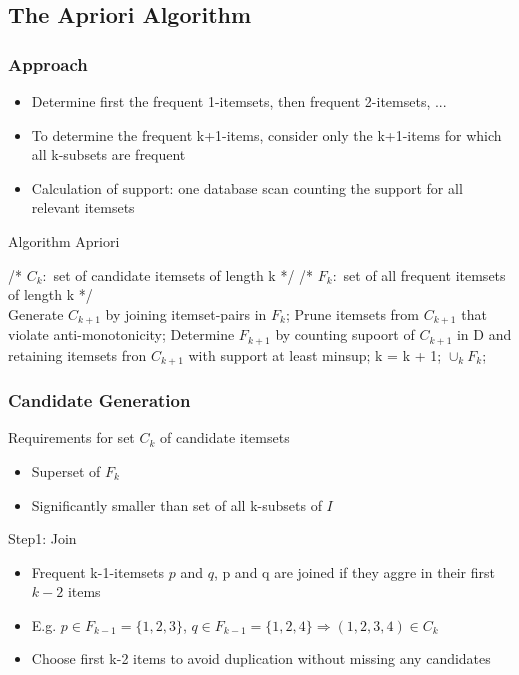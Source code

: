 \documentclass[../notes.tex]{subfiles}
\begin{document}
\subsection{The Apriori Algorithm}
\subsubsection{Approach}
\begin{itemize}
  \item Determine first the frequent 1-itemsets, then frequent 2-itemsets, ...
  \item To determine the frequent k+1-items, consider only the k+1-items for which all k-subsets are frequent
  \item Calculation of support: one database scan counting the support for all relevant itemsets
\end{itemize}

\begin{algorithm}
\caption{Algorithm Apriori}
\begin{algorithmic}[0]
\State /* $C_k:$ set of candidate itemsets of length k */
\State /* $F_k:$ set of all frequent itemsets of length k */ \\
  \State Generate $C_{k+1}$ by joining itemset-pairs in $F_k$;
  \State Prune itemsets from $C_{k+1}$ that violate anti-monotonicity;
  \State Determine $F_{k+1}$ by counting supoort of $C_{k+1}$ in D and retaining itemsets fron $C_{k+1}$ with support at least minsup;
  \State k = k + 1;
\EndWhile
\Return $\cup_k F_k$;
\EndFunction
\end{algorithmic}
\end{algorithm}

\newpage

\subsubsection{Candidate Generation}
Requirements for set $C_k$ of candidate itemsets
\begin{itemize}
  \item Superset of $F_k$
  \item Significantly smaller than set of all k-subsets of $I$
\end{itemize}

Step1: Join
\begin{itemize}
  \item Frequent k-1-itemsets $p$ and $q$, p and q are joined if they aggre in their first $k-2$ items
  \item E.g. $p \in F_{k-1} = \{1,2,3\}$, $q \in F_{k-1} = \{1,2,4\} \Rightarrow (1,2,3,4) \in C_k$
  \item Choose first k-2 items to avoid duplication without missing any candidates
\end{itemize}
\end{document}
